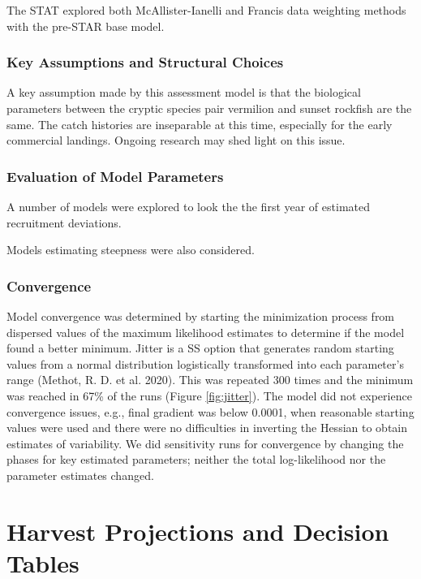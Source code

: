 \documentclass[
  english,
  a4paper,
]{article}
\begin{document}
The STAT explored both McAllister-Ianelli and Francis data weighting methods with the
pre-STAR base model.

\hypertarget{key-assumptions-and-structural-choices}{%
\subsubsection{Key Assumptions and Structural Choices}\label{key-assumptions-and-structural-choices}}

A key assumption made by this assessment model is that the biological parameters between the cryptic species pair vermilion and sunset rockfish are the same. The catch histories are inseparable at this time, especially for
the early commercial landings. Ongoing research may shed light on this issue.

\hypertarget{evaluation-of-model-parameters}{%
\subsubsection{Evaluation of Model Parameters}\label{evaluation-of-model-parameters}}

A number of models were explored to look the the first year of estimated recruitment deviations.

Models estimating steepness were also considered.

\hypertarget{convergence}{%
\subsubsection{Convergence}\label{convergence}}

Model convergence was determined by starting the minimization process from dispersed
values of the maximum likelihood estimates to determine if the model found a better
minimum. Jitter is a SS option that generates random starting values from a normal
distribution logistically transformed into each parameter's range (Methot, R. D. et al. 2020). This
was repeated 300 times and the minimum was reached in 67\% of the runs (Figure \ref{fig:jitter}).
The model did not experience convergence issues, e.g., final gradient was below 0.0001,
when reasonable starting values were used and there were no difficulties in inverting
the Hessian to obtain estimates of variability. We did sensitivity runs for
convergence by changing the phases for key estimated parameters; neither the total
log-likelihood nor the parameter estimates changed.

\hypertarget{harvest-projections-and-decision-tables}{%
\section{Harvest Projections and Decision Tables}\label{harvest-projections-and-decision-tables}}
\end{document}
